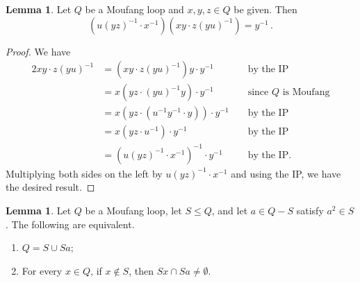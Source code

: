 \documentclass[12pt]{report}
\theoremstyle{definition}
\newtheorem{lem}[thm]{Lemma}
\begin{document}
\begin{lem}\label{tech-coset-int}
  Let $Q$ be a Moufang loop and $x,y,z\in Q$ be given. Then
  \[
  (u(yz)^{-1}\cdot x^{-1})(xy\cdot z(yu)^{-1}) = y^{-1}\,.
  \]
  \end{lem}
  \begin{proof}
  We have 
  \begin{alignat*}{2}
  xy\cdot z(yu)^{-1}
      &= (xy\cdot z(yu)^{-1})y\cdot y^{-1}            && \text{ by the IP} \\
      &= x(yz\cdot (yu)^{-1}y)\cdot y^{-1}            && \text{ since }Q\text{ is Moufang} \\
      &= x(yz\cdot (u^{-1}y^{-1}\cdot y))\cdot y^{-1} && \text{ by the IP} \\
      &= x(yz\cdot u^{-1})\cdot y^{-1}                && \text{ by the IP} \\
      &= (u(yz)^{-1}\cdot x^{-1})^{-1}\cdot y^{-1}    && \text{ by the IP.}
  \end{alignat*}
  Multiplying both sides on the left by $u(yz)^{-1}\cdot x^{-1}$ and using the IP, we have the desired result.
\end{proof}

\begin{lem}\label{lem-q-part}
  Let $Q$ be a Moufang loop, let $S\leq Q$, and let $a\in Q- S$ satisfy $a^2\in S$. The following are equivalent.
  \begin{enumerate}
    \item $Q = S\cup Sa$;
    \item For every $x\in Q$, if $x\not\in S$, then $Sx\cap Sa\neq \emptyset$.
  \end{enumerate}
\end{lem}
\end{document}
